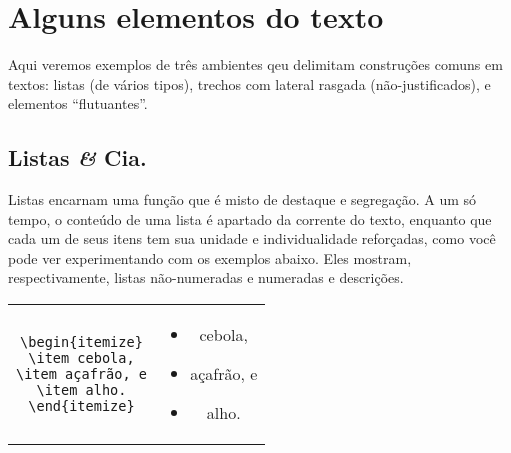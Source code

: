 \section{Alguns elementos do texto}

Aqui veremos exemplos de três ambientes qeu delimitam construções
comuns em textos: listas (de vários tipos), trechos com lateral
rasgada (não-justificados), e elementos ``flutuantes''.

\subsection[Listas]{Listas {\it \&} Cia.}

Listas encarnam uma função que é misto de destaque e segregação. A um
só tempo, o conteúdo de uma lista é apartado da corrente do texto,
enquanto que cada um de seus itens tem sua unidade e individualidade
reforçadas, como você pode ver experimentando com os exemplos abaixo.
Eles mostram, respectivamente, listas
não-numeradas e
numeradas e descrições.

\begin{center}\footnotesize\smallskip
\begin{tabular}{cc}
\begin{minipage}{.465\textwidth}
\begin{verbatim}
\begin{itemize}
\item cebola,
\item açafrão, e
\item alho.
\end{itemize}
\end{verbatim}
\end{minipage} &
\begin{minipage}{.465\textwidth}
\begin{itemize}
\item cebola,
\item açafrão, e
\item alho.
\end{itemize}
\end{minipage}
\end{tabular}
\smallskip
\end{center}

